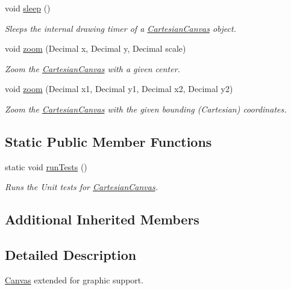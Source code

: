\begin{DoxyCompactItemize}
void \hyperlink{classtsgl_1_1_cartesian_canvas_a3ae99570b9a5f68f4ccf31593867edb0}{sleep} ()
\begin{DoxyCompactList}\small\item\em Sleeps the internal drawing timer of a \hyperlink{classtsgl_1_1_cartesian_canvas}{Cartesian\+Canvas} object. \end{DoxyCompactList}\item 
void \hyperlink{classtsgl_1_1_cartesian_canvas_a69a378f61868c4c880889c33ec33c992}{zoom} (Decimal x, Decimal y, Decimal scale)
\begin{DoxyCompactList}\small\item\em Zoom the \hyperlink{classtsgl_1_1_cartesian_canvas}{Cartesian\+Canvas} with a given center. \end{DoxyCompactList}\item 
void \hyperlink{classtsgl_1_1_cartesian_canvas_adb1e999087c0ec7e4405d8ebd3ca9760}{zoom} (Decimal x1, Decimal y1, Decimal x2, Decimal y2)
\begin{DoxyCompactList}\small\item\em Zoom the \hyperlink{classtsgl_1_1_cartesian_canvas}{Cartesian\+Canvas} with the given bounding (Cartesian) coordinates. \end{DoxyCompactList}\end{DoxyCompactItemize}
\subsection*{Static Public Member Functions}
\begin{DoxyCompactItemize}
\item 
\hypertarget{classtsgl_1_1_cartesian_canvas_ae40d704629167ff70303a3c55ee3bb43}{}static void \hyperlink{classtsgl_1_1_cartesian_canvas_ae40d704629167ff70303a3c55ee3bb43}{run\+Tests} ()\label{classtsgl_1_1_cartesian_canvas_ae40d704629167ff70303a3c55ee3bb43}

\begin{DoxyCompactList}\small\item\em Runs the Unit tests for \hyperlink{classtsgl_1_1_cartesian_canvas}{Cartesian\+Canvas}. \end{DoxyCompactList}\end{DoxyCompactItemize}
\subsection*{Additional Inherited Members}


\subsection{Detailed Description}
\hyperlink{classtsgl_1_1_canvas}{Canvas} extended for graphic support. 

